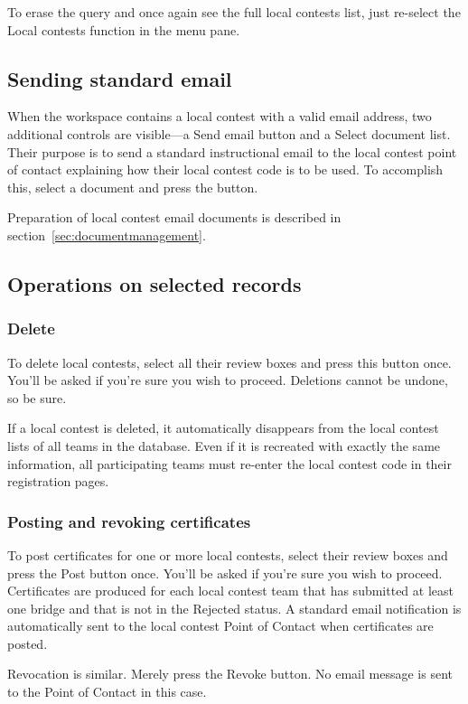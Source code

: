 \documentclass[11pt,letterpaper]{refart}
\def\ui#1{\textsf{#1}}
\begin{document}
To erase the query and once again see the full local contests list,
just re-select the \ui{Local contests} function in the menu pane.

\subsection{Sending standard email}
When the workspace contains a local contest with a valid email
address, two additional controls are visible---a \ui{Send email}
button and a \ui{Select document} list. Their purpose is to send a
standard instructional email to the local contest point of contact
explaining how their local contest code is to be used. To accomplish
this, select a document and press the button.

Preparation of local contest email documents is described in
section~\ref{sec:documentmanagement}.

\subsection{Operations on selected records}

\subsubsection{Delete}
To delete local contests, select all their review boxes and press this
button once. You'll be asked if you're sure you wish to
proceed. Deletions cannot be undone, so be sure.

If a local contest is deleted, it automatically disappears from the
local contest lists of all teams in the database. Even if it is
recreated with exactly the same information, all participating teams
must re-enter the local contest code in their registration pages.

\subsubsection{Posting and revoking certificates}
To post certificates for one or more local contests, select their
review boxes and press the Post button once. You'll be asked if you're
sure you wish to proceed.  Certificates are produced for each local
contest team that has submitted at least one bridge and that is not in
the Rejected status.  A standard email notification is automatically
sent to the local contest Point of Contact when certificates are
posted.

Revocation is similar. Merely press the Revoke button. No email
message is sent to the Point of Contact in this case.
\end{document}
